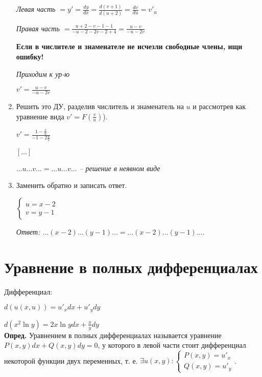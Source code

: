 \documentclass[10pt, a4paper]{article}
\begin{document}
\begin{enumerate}
        \par\textit{Левая часть $ = y' =  \frac{dy}{dx} = \frac{d(v + 1)}{d(u + 2)} = \frac{dv}{du} = v'_u$}
        \par\textit{Правая часть $ = \frac{u + 2 - v - 1 - 1}{-u - 2 - 2v - 2 + 4} = \frac{u - v}{-u - 2v}$}
        \par\textbf{Если в числителе и знаменателе не исчезли свободные члены, ищи ошибку!}
        \par\textit{Приходим к ур-ю}
        \par $v' = \frac{u - v}{-u - 2v}$
    \item Решить это ДУ, разделив числитель и знаменатель на $u$ и рассмотрев как уравнение вида $v' = F(\frac{v}{u})$).
        \par $v' = \frac{1 - \frac{v}{u}}{-1 - 2\frac{u}{v}}$
        \par $[...]$
        \par\textit{$...u...v... = ...u...v...$ -- решение в неявном виде}
    \item Заменить обратно и записать ответ.
        \par$\begin{cases}
            u = x - 2 \\
            v = y - 1
            \end{cases}$
        \par\textit{Ответ: $...(x - 2)...(y - 1)... = ...(x - 2)...(y - 1)...$.}
\end{enumerate}


\section{Уравнение в полных дифференциалах}
Дифференциал:
\par $d(u(x, u)) = u'_xdx + u'_ydy$
\par $d(x^2\ln{y}) = 2x\ln{y}dx + \frac{x}{y}dy$ \\
\textbf{Опред.} Уравнением в полных дифференциалах называется уравнение $P(x, y)dx + Q(x, y)dy = 0$,
у которого в левой части стоит дифференциал некоторой функции двух переменных, т. е. $\exists u(x, y):
\begin{cases}
    P(x, y) = u'_x \\
    Q(x, y) = u'_y
\end{cases}$.
\end{document}
